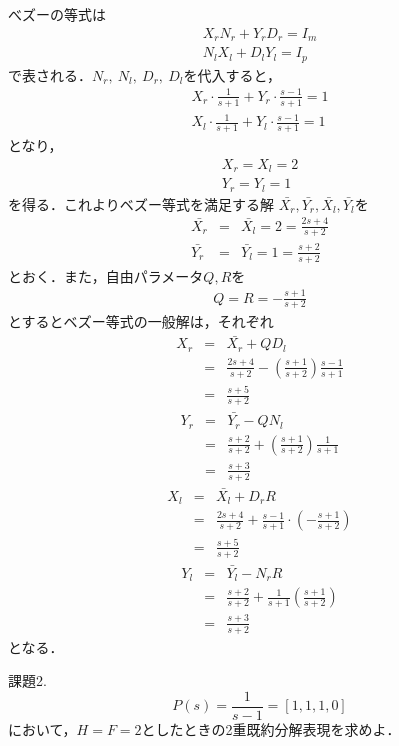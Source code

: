 \documentclass[a4paper,12pt]{jarticle}
\begin{document}
\section*{}
べズーの等式は
%
\begin{eqnarray}
 X_rN_r+Y_rD_r=I_m\\
 N_lX_l+D_lY_l=I_p
\end{eqnarray}
%
で表される．$N_r,~N_l,~D_r,~D_l$を代入すると，
%
\begin{eqnarray}
 X_r\cdot\frac{1}{s+1}+Y_r\cdot\frac{s-1}{s+1}=1\\
 X_l\cdot\frac{1}{s+1}+Y_l\cdot\frac{s-1}{s+1}=1
\end{eqnarray}
%
となり，
%
\begin{eqnarray}
 X_r=X_l=2\\
 Y_r=Y_l=1
\end{eqnarray}
%
を得る．これよりベズー等式を満足する解
$\bar{X_r},\bar{Y_r},\bar{X_l},\bar{Y_l}$を
%
\begin{eqnarray}
 \bar{X_r}&=&\bar{X_l}=2=\frac{2s+4}{s+2} \\
 \bar{Y_r}&=&\bar{Y_l}=1=\frac{s+2}{s+2}
\end{eqnarray}
%
とおく．また，自由パラメータ$Q,R$を
%
\begin{eqnarray}
 Q=R=-\frac{s+1}{s+2}
\end{eqnarray}
%
とするとベズー等式の一般解は，それぞれ
%
\begin{eqnarray}
 X_r&=&\bar{X_r}+QD_l \nonumber\\
 &=&\frac{2s+4}{s+2}-\left(\frac{s+1}{s+2}\right)\frac{s-1}{s+1} \nonumber\\
 &=&\frac{s+5}{s+2}
\end{eqnarray}
%
%
\begin{eqnarray}
 Y_r&=&\bar{Y_r}-QN_l \nonumber\\
 &=&\frac{s+2}{s+2}+\left(\frac{s+1}{s+2}\right)\frac{1}{s+1} \nonumber\\
 &=&\frac{s+3}{s+2}
\end{eqnarray}
%
%
\begin{eqnarray}
 X_l&=&\bar{X_l}+D_rR \nonumber\\
 &=&\frac{2s+4}{s+2}+\frac{s-1}{s+1}\cdot\left(-\frac{s+1}{s+2}\right) \nonumber\\
 &=&\frac{s+5}{s+2}
\end{eqnarray}
%
%
\begin{eqnarray}
 Y_l&=&\bar{Y_l}-N_rR \nonumber\\
 &=&\frac{s+2}{s+2}+\frac{1}{s+1}\left(\frac{s+1}{s+2}\right) \nonumber\\
 &=&\frac{s+3}{s+2}
\end{eqnarray}
%
となる．
\newpage
\begin{itembox}[l]{\Large{課題2.}}
%
 \begin{equation}
 P(s)=\frac{1}{s-1}=[1,1,1,0]
 \end{equation}
 において，$H=F=2$としたときの2重既約分解表現を求めよ．
\end{itembox}
\end{document}
